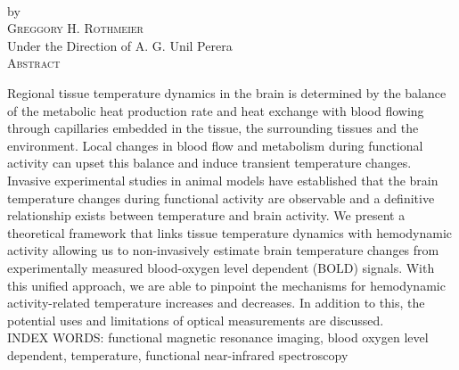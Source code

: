 \thispagestyle{empty}
\begin{center}
  \normalsize
  \textsc{\thesisTitle } \\
  \vspace{0.2in}
  by \\
  \vspace{0.2in}
  \textsc{Greggory H. Rothmeier} \\
  \vspace{0.2in}
  Under the Direction of A. G. Unil Perera\\
  \vspace{0.2in}
  \textsc{Abstract}
  \vspace{0.2in}
\end{center}
    Regional tissue temperature dynamics in the brain is determined by the balance of the metabolic heat production rate and heat exchange with blood flowing through capillaries embedded in the tissue, the surrounding tissues and the environment. Local changes in blood flow and metabolism during functional activity can upset this balance and induce transient temperature changes. Invasive experimental studies in animal models have established that the brain temperature changes during functional activity are observable and a definitive relationship exists between temperature and brain activity. We present a theoretical framework that links tissue temperature dynamics with hemodynamic activity allowing us to non-invasively estimate brain temperature changes from experimentally measured blood-oxygen level dependent (BOLD) signals. With this unified approach, we are able to pinpoint the mechanisms for hemodynamic activity-related temperature increases and decreases.  In addition to this, the potential uses and limitations of optical measurements are discussed.  
\vspace*{\fill}\\
INDEX WORDS: functional magnetic resonance imaging, blood oxygen level dependent, temperature, functional near-infrared spectroscopy